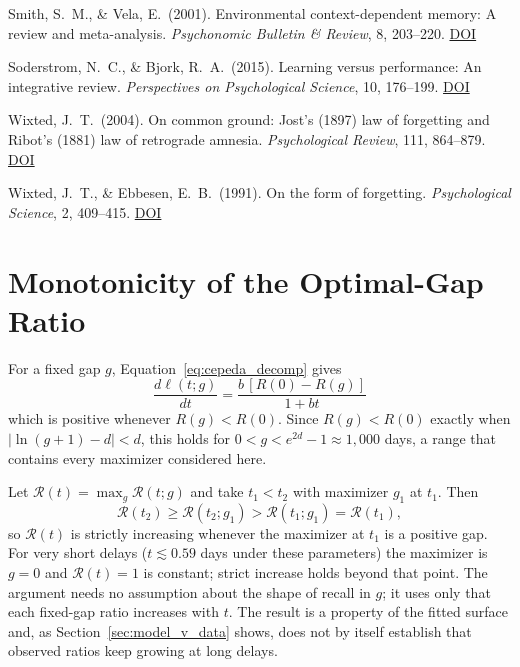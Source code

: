 \documentclass[10pt,twocolumn]{article}
\newcommand{\effr}{\mathcal{R}}
\newcommand{\lr}{\ell}
\begin{document}
\noindent Smith, S.\ M., \& Vela, E.\ (2001). Environmental context-dependent memory: A review and meta-analysis. \textit{Psychonomic Bulletin \& Review}, 8, 203--220. \href{https://doi.org/10.3758/BF03196157}{DOI}

\noindent Soderstrom, N.\ C., \& Bjork, R.\ A.\ (2015). Learning versus performance: An integrative review. \textit{Perspectives on Psychological Science}, 10, 176--199. \href{https://doi.org/10.1177/1745691615569000}{DOI}

\noindent Wixted, J.\ T.\ (2004). On common ground: Jost's (1897) law of forgetting and Ribot's (1881) law of retrograde amnesia. \textit{Psychological Review}, 111, 864--879. \href{https://doi.org/10.1037/0033-295X.111.4.864}{DOI}

\noindent Wixted, J.\ T., \& Ebbesen, E.\ B.\ (1991). On the form of forgetting. \textit{Psychological Science}, 2, 409--415. \href{https://doi.org/10.1111/j.1467-9280.1991.tb00175.x}{DOI}

\normalsize
\appendix
\section{Monotonicity of the Optimal-Gap Ratio}
\label{app:monotonicity}

For a fixed gap $g$, Equation~\ref{eq:cepeda_decomp} gives
\begin{equation}
\frac{d\lr(t;g)}{dt} = \frac{b\,[R(0) - R(g)]}{1 + bt}
\label{eq:derivative}
\end{equation}
which is positive whenever $R(g) < R(0)$. Since $R(g) < R(0)$ exactly when $|\ln(g+1) - d| < d$, this holds for $0 < g < e^{2d} - 1 \approx 1{,}000$ days, a range that contains every maximizer considered here.

Let $\effr(t) = \max_g \effr(t;g)$ and take $t_1 < t_2$ with maximizer $g_1$ at $t_1$. Then
\[
\effr(t_2) \geq \effr(t_2; g_1) > \effr(t_1; g_1) = \effr(t_1),
\]
so $\effr(t)$ is strictly increasing whenever the maximizer at $t_1$ is a positive gap. For very short delays ($t \lesssim 0.59$ days under these parameters) the maximizer is $g = 0$ and $\effr(t) = 1$ is constant; strict increase holds beyond that point. The argument needs no assumption about the shape of recall in $g$; it uses only that each fixed-gap ratio increases with $t$. The result is a property of the fitted surface and, as Section~\ref{sec:model_v_data} shows, does not by itself establish that observed ratios keep growing at long delays.
\end{document}
